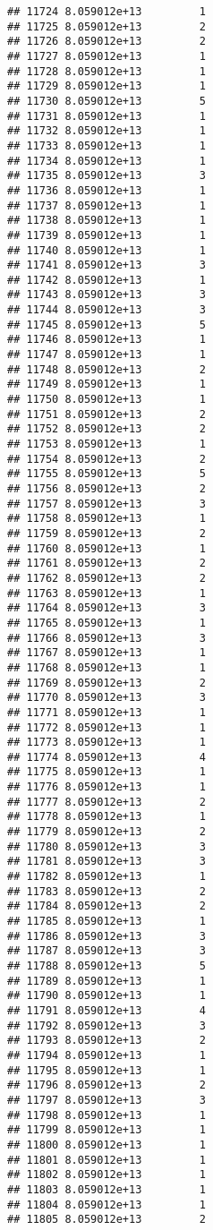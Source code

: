 \documentclass[
]{article}
\begin{document}
\begin{verbatim}
## 11724 8.059012e+13         1
## 11725 8.059012e+13         2
## 11726 8.059012e+13         2
## 11727 8.059012e+13         1
## 11728 8.059012e+13         1
## 11729 8.059012e+13         1
## 11730 8.059012e+13         5
## 11731 8.059012e+13         1
## 11732 8.059012e+13         1
## 11733 8.059012e+13         1
## 11734 8.059012e+13         1
## 11735 8.059012e+13         3
## 11736 8.059012e+13         1
## 11737 8.059012e+13         1
## 11738 8.059012e+13         1
## 11739 8.059012e+13         1
## 11740 8.059012e+13         1
## 11741 8.059012e+13         3
## 11742 8.059012e+13         1
## 11743 8.059012e+13         3
## 11744 8.059012e+13         3
## 11745 8.059012e+13         5
## 11746 8.059012e+13         1
## 11747 8.059012e+13         1
## 11748 8.059012e+13         2
## 11749 8.059012e+13         1
## 11750 8.059012e+13         1
## 11751 8.059012e+13         2
## 11752 8.059012e+13         2
## 11753 8.059012e+13         1
## 11754 8.059012e+13         2
## 11755 8.059012e+13         5
## 11756 8.059012e+13         2
## 11757 8.059012e+13         3
## 11758 8.059012e+13         1
## 11759 8.059012e+13         2
## 11760 8.059012e+13         1
## 11761 8.059012e+13         2
## 11762 8.059012e+13         2
## 11763 8.059012e+13         1
## 11764 8.059012e+13         3
## 11765 8.059012e+13         1
## 11766 8.059012e+13         3
## 11767 8.059012e+13         1
## 11768 8.059012e+13         1
## 11769 8.059012e+13         2
## 11770 8.059012e+13         3
## 11771 8.059012e+13         1
## 11772 8.059012e+13         1
## 11773 8.059012e+13         1
## 11774 8.059012e+13         4
## 11775 8.059012e+13         1
## 11776 8.059012e+13         1
## 11777 8.059012e+13         2
## 11778 8.059012e+13         1
## 11779 8.059012e+13         2
## 11780 8.059012e+13         3
## 11781 8.059012e+13         3
## 11782 8.059012e+13         1
## 11783 8.059012e+13         2
## 11784 8.059012e+13         2
## 11785 8.059012e+13         1
## 11786 8.059012e+13         3
## 11787 8.059012e+13         3
## 11788 8.059012e+13         5
## 11789 8.059012e+13         1
## 11790 8.059012e+13         1
## 11791 8.059012e+13         4
## 11792 8.059012e+13         3
## 11793 8.059012e+13         2
## 11794 8.059012e+13         1
## 11795 8.059012e+13         1
## 11796 8.059012e+13         2
## 11797 8.059012e+13         3
## 11798 8.059012e+13         1
## 11799 8.059012e+13         1
## 11800 8.059012e+13         1
## 11801 8.059012e+13         1
## 11802 8.059012e+13         1
## 11803 8.059012e+13         1
## 11804 8.059012e+13         1
## 11805 8.059012e+13         2

\end{verbatim}
\end{document}
